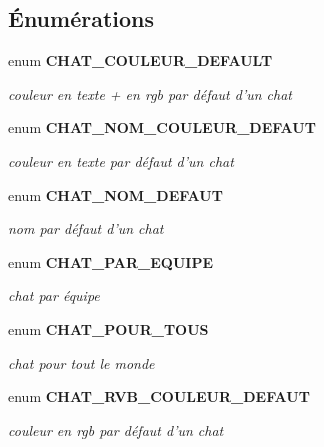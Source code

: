 \subsection*{Énumérations}
\begin{CompactItemize}
\item 
enum {\bf CHAT\_\-COULEUR\_\-DEFAULT} 
\begin{CompactList}\small\item\em couleur en texte + en rgb par défaut d'un chat \item\end{CompactList}\item 
enum {\bf CHAT\_\-NOM\_\-COULEUR\_\-DEFAUT} 
\begin{CompactList}\small\item\em couleur en texte par défaut d'un chat \item\end{CompactList}\item 
enum {\bf CHAT\_\-NOM\_\-DEFAUT} 
\begin{CompactList}\small\item\em nom par défaut d'un chat \item\end{CompactList}\item 
enum {\bf CHAT\_\-PAR\_\-EQUIPE} 
\begin{CompactList}\small\item\em chat par équipe \item\end{CompactList}\item 
enum {\bf CHAT\_\-POUR\_\-TOUS} 
\begin{CompactList}\small\item\em chat pour tout le monde \item\end{CompactList}\item 
enum {\bf CHAT\_\-RVB\_\-COULEUR\_\-DEFAUT} 
\begin{CompactList}\small\item\em couleur en rgb par défaut d'un chat \item\end{CompactList}\end{CompactItemize}
